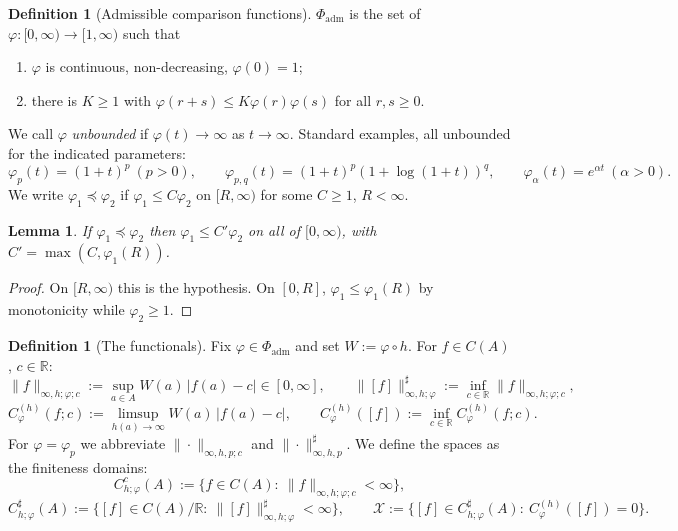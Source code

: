 \documentclass[11pt,a4paper]{article}
\numberwithin{equation}{section}
\theoremstyle{plain}
\newtheorem{lemma}[theorem]{Lemma}
\theoremstyle{definition}
\newtheorem{definition}[theorem]{Definition}
\theoremstyle{remark}
\newcommand{\R}{\mathbb{R}}
\newcommand{\Xdec}{\mathcal{X}}
\begin{document}
\begin{definition}[Admissible comparison functions]\label{def:admissible}
$\Phi_{\mathrm{adm}}$ is the set of $\varphi:[0,\infty)\to[1,\infty)$ such that
\begin{enumerate}
\item[(A1)] $\varphi$ is continuous, non-decreasing, $\varphi(0)=1$;
\item[(A2)] there is $K\ge1$ with $\varphi(r+s)\le K\varphi(r)\varphi(s)$ for all $r,s\ge0$.
\end{enumerate}
We call $\varphi$ \emph{unbounded} if $\varphi(t)\to\infty$ as $t\to\infty$. Standard
examples, all unbounded for the indicated parameters:
\[
\varphi_p(t)=(1+t)^{p}\ (p>0),\qquad
\varphi_{p,q}(t)=(1+t)^{p}(1+\log(1+t))^{q},\qquad
\varphi_\alpha(t)=e^{\alpha t}\ (\alpha>0).
\]
We write $\varphi_1\preceq\varphi_2$ if $\varphi_1\le C\varphi_2$ on $[R,\infty)$ for some
$C\ge1$, $R<\infty$.
\end{definition}

\begin{lemma}\label{lem:preceq-global}
If $\varphi_1\preceq\varphi_2$ then $\varphi_1\le C'\varphi_2$ on all of $[0,\infty)$,
with $C'=\max(C,\varphi_1(R))$.
\end{lemma}

\begin{proof}
On $[R,\infty)$ this is the hypothesis. On $[0,R]$, $\varphi_1\le\varphi_1(R)$ by
monotonicity while $\varphi_2\ge1$.
\end{proof}

\begin{definition}[The functionals]\label{def:norms}
Fix $\varphi\in\Phi_{\mathrm{adm}}$ and set $W:=\varphi\circ h$. For $f\in C(A)$,
$c\in\R$:
\[
\|f\|_{\infty,h;\varphi;c}:=\sup_{a\in A}W(a)\,|f(a)-c|\in[0,\infty],
\qquad
\|[f]\|^{\sharp}_{\infty,h;\varphi}:=\inf_{c\in\R}\|f\|_{\infty,h;\varphi;c},
\]
\[
C^{(h)}_\varphi(f;c):=\limsup_{h(a)\to\infty}W(a)\,|f(a)-c|,
\qquad
C^{(h)}_\varphi([f]):=\inf_{c\in\R}C^{(h)}_\varphi(f;c).
\]
For $\varphi=\varphi_p$ we abbreviate $\|\cdot\|_{\infty,h,p;c}$ and
$\|\cdot\|^{\sharp}_{\infty,h,p}$. We define the spaces as the finiteness domains:
\[
C^{c}_{h;\varphi}(A):=\bigl\{f\in C(A):\ \|f\|_{\infty,h;\varphi;c}<\infty\bigr\},
\]
\[
C^{\sharp}_{h;\varphi}(A):=\bigl\{[f]\in C(A)/\R:\ \|[f]\|^{\sharp}_{\infty,h;\varphi}<\infty\bigr\},
\qquad
\Xdec:=\bigl\{[f]\in C^{\sharp}_{h;\varphi}(A):\ C^{(h)}_\varphi([f])=0\bigr\}.
\]
\end{definition}
\end{document}
